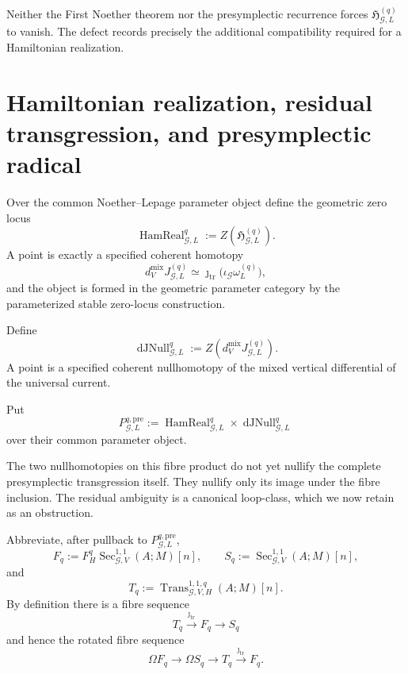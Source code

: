 \begin{remark}
\label{rem:symmetry-noether-the-defect-is-not-declared-zero}
Neither the First Noether theorem nor the presymplectic recurrence forces
$\mathfrak H_{\mathcal G,L}^{(q)}$ to vanish.  The defect records precisely
the additional compatibility required for a Hamiltonian realization.
\end{remark}

\section{Hamiltonian realization, residual transgression, and presymplectic radical}
\label{sec:symmetry-noether-hamiltonian-realization-residual-transgression-and-presymplectic-radical}

\begin{definition}
\label{def:symmetry-noether-hamiltonian-realization-object}
Over the common Noether--Lepage parameter object define the geometric zero locus
\[
\boxed{
\operatorname{HamReal}_{\mathcal G,L}^{q}
:=
Z\!\left(\mathfrak H_{\mathcal G,L}^{(q)}\right).
}
\]
A point is exactly a specified coherent homotopy
\[
d_V^{\mathrm{mix}}J_{\mathcal G,L}^{(q)}
\simeq
\jmath_{\mathrm{tr}}
\bigl(
\iota_{\mathcal G}\omega_L^{(q)}
\bigr),
\]
and the object is formed in the geometric parameter category by the parameterized
stable zero-locus construction.
\end{definition}

\begin{definition}
\label{def:symmetry-noether-current-differential-nullification}
Define
\[
\boxed{
\operatorname{dJNull}_{\mathcal G,L}^{q}
:=
Z\!\left(d_V^{\mathrm{mix}}J_{\mathcal G,L}^{(q)}\right).
}
\]
A point is a specified coherent nullhomotopy of the mixed vertical differential of
the universal current.
\end{definition}

Put
\[
P_{\mathcal G,L}^{q,\mathrm{pre}}
:=
\operatorname{HamReal}_{\mathcal G,L}^{q}
\times
\operatorname{dJNull}_{\mathcal G,L}^{q}
\]
over their common parameter object.

The two nullhomotopies on this fibre product do not yet nullify the complete
presymplectic transgression itself.  They nullify only its image under the fibre
inclusion.  The residual ambiguity is a canonical loop-class, which we now retain
as an obstruction.

Abbreviate, after pullback to
$P_{\mathcal G,L}^{q,\mathrm{pre}}$,
\[
F_q
:=
F_H^q
\operatorname{Sec}_{\mathcal G,V}^{1,1}(A;M)[n],
\qquad
S_q
:=
\operatorname{Sec}_{\mathcal G,V}^{1,1}(A;M)[n],
\]
and
\[
T_q
:=
\operatorname{Trans}_{\mathcal G,V,H}^{1,1,q}(A;M)[n].
\]
By definition there is a fibre sequence
\[
T_q
\xrightarrow{\jmath_{\mathrm{tr}}}
F_q
\longrightarrow
S_q
\]
and hence the rotated fibre sequence
\[
\Omega F_q
\longrightarrow
\Omega S_q
\longrightarrow
T_q
\xrightarrow{\jmath_{\mathrm{tr}}}
F_q.
\]

